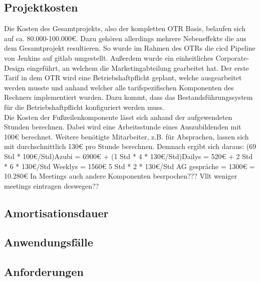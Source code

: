 \subsection{Projektkosten}
\label{projektkosten}
Die Kosten des Gesamtprojekts, also der kompletten \ac{OTR} Basis, belaufen sich auf ca. 80.000-100.000€. Dazu gehören allerdings mehrere Nebeneffekte die aus dem Gesamtprojekt  resultieren. So wurde im Rahmen des \ac{OTR}s die \ac{cicd} Pipeline von Jenkins auf \gls{gitlab} umgestellt. Außerdem wurde ein einheitliches Corporate-Design eingeführt, an welchem die Marketingabteilung gearbeitet hat. Der erste Tarif in dem \ac{OTR} wird eine Betriebshaftpflicht geplant, welche ausgearbeitet werden musste und anhand welcher alle tarifspezifischen Komponenten des Rechners implementiert wurden. Dazu kommt, dass das Bestandsführungssystem für die Betriebshaftpflicht konfiguriert werden muss.\\

Die Kosten der Fußzeilenkomponente lässt sich anhand der aufgewendeten Stunden berechnen.
Dabei wird eine Arbeitsstunde eines Auszubildenden mit 100€ berechnet. Weitere benötigte Mitarbeiter, z.B. für Absprachen, lassen sich mit durchschnittlich 130€ pro Stunde berechnen. 
Demnach ergibt sich daraus:
(69 Std * 100€/Std)Azubi = 6900€
 + 
 (1 Std * 4 * 130€/Std)Dailys = 520€
 + 
 2 Std * 6 * 130€/Std Weeklys = 1560€
 5 Std * 2 *  130€/Std AG gespräche = 1300€
 = 10.280€
 In Meetings auch andere Komponenten besrpochen??? Vllt weniger meetings eintragen deswegen??
\subsection{Amortisationsdauer}
\label{amortisationsdauer}

\subsection{Anwendungsfälle}
\label{anwednungsfaelle}

\subsection{Anforderungen}
\label{anforderungen}


